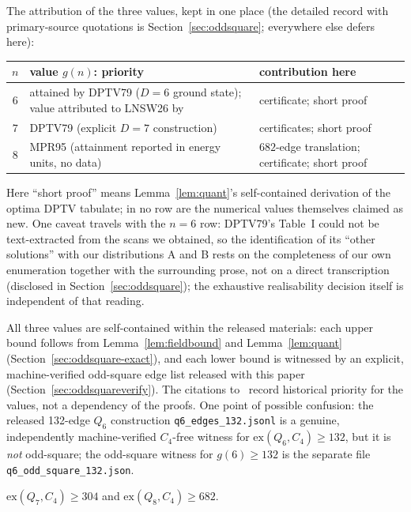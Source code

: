\documentclass[12pt]{article}
\newcommand{\ex}{\mathrm{ex}}
\begin{document}
\noindent The attribution of the three values, kept in one place (the
detailed record with primary-source quotations is
Section~\ref{sec:oddsquare}; everywhere else defers here):

\begin{center}\small
\begin{tabular}{@{}c p{6.6cm} p{3.9cm}@{}}
\toprule
$n$ & value $g(n)$: priority & contribution here\\
\midrule
$6$ & attained by DPTV79 ($D{=}6$ ground state); value attributed to LNSW26 by~\cite{Emlek26} & certificate; short proof\\
$7$ & DPTV79 (explicit $D{=}7$ construction) & certificates; short proof\\
$8$ & MPR95 (attainment reported in energy units, no data) & $682$-edge translation; certificate; short proof\\
\bottomrule
\end{tabular}
\end{center}

\noindent Here ``short proof'' means Lemma~\ref{lem:quant}'s self-contained
derivation of the optima DPTV tabulate; in no row are the numerical values
themselves claimed as new. One caveat travels with the $n=6$ row: DPTV79's
Table~I could not be text-extracted from the scans we obtained, so the
identification of its ``other solutions'' with our distributions A and B
rests on the completeness of our own enumeration together with the
surrounding prose, not on a direct transcription (disclosed in
Section~\ref{sec:oddsquare}); the exhaustive realisability decision itself
is independent of that reading.

\noindent All three values are self-contained within the released
materials: each upper bound follows from Lemma~\ref{lem:fieldbound} and
Lemma~\ref{lem:quant} (Section~\ref{sec:oddsquare-exact}), and each
lower bound is witnessed by an explicit, machine-verified odd-square
edge list released with this paper
(Section~\ref{sec:oddsquareverify}). The citations
to~\cite{DPTV79,MPR95} record historical priority for the values, not a
dependency of the proofs. One point of possible confusion: the released
132-edge $Q_6$ construction \texttt{q6\_edges\_132.jsonl} is a genuine,
independently machine-verified $C_4$-free witness for
$\ex(Q_6,C_4)\ge132$, but it is \emph{not} odd-square; the odd-square
witness for $g(6)\ge132$ is the separate file
\texttt{q6\_odd\_square\_132.json}.

\begin{corollary}\label{thm:main}
$\ex(Q_7,C_4)\ge304$ and $\ex(Q_8,C_4)\ge682$.
\end{corollary}
\end{document}
